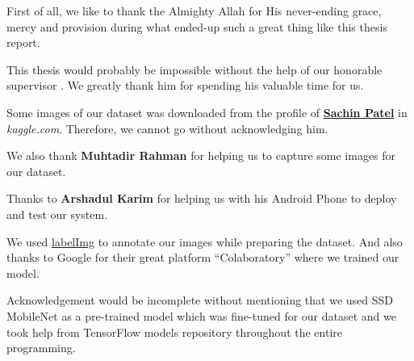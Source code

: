 {\raggedright
First of all, we like to thank the Almighty Allah for His never-ending grace, mercy and provision during what ended-up such a great thing like this thesis report.

\vspace{5mm}
This thesis would probably be impossible without the help of our honorable supervisor \textbf{\supervisorname}. We greatly thank him for spending his valuable time for us.

\vspace{5mm}
Some images of our dataset was downloaded from the profile of \href{https://www.kaggle.com/sachinpatel21}{\textbf{Sachin Patel}} in {\itshape kaggle.com}. Therefore, we cannot go without acknowledging him.

\vspace{5mm}
We also thank \textbf{Muhtadir Rahman} for helping us to capture some images for our dataset.

\vspace{5mm}
Thanks to \textbf{Arshadul Karim} for helping us with his Android Phone to deploy and test our system.

\vspace{5mm}
We used \href{https://github.com/tzutalin/labelImg}{labelImg} to annotate our images while preparing the dataset. And also thanks to Google for their great platform ``Colaboratory'' where we trained our model.

\vspace{5mm}
Acknowledgement would be incomplete without mentioning that we used SSD MobileNet as a pre-trained model which was fine-tuned for our dataset and we took help from TensorFlow models repository throughout the entire programming.
}
